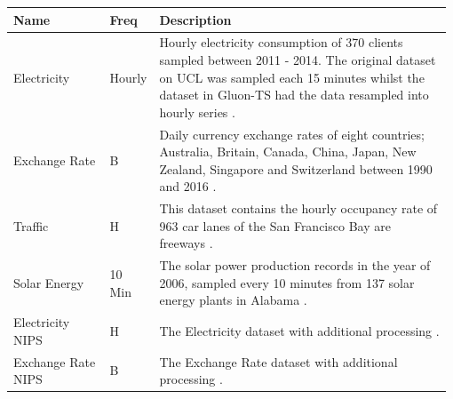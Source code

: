 \begin{table}[h]
  \centering
  \begin{tabular}{p{0.22\linewidth} | p{0.09\linewidth} | p{0.67\linewidth}}
    Name               & Freq   & Description                                                                                                                                                                                                                                                        \\ \hline
    Electricity        & Hourly & Hourly electricity consumption of 370 clients sampled between 2011 - 2014. The original dataset on UCL was sampled each 15 minutes whilst the dataset in Gluon-TS had the data resampled into hourly series \cite{gluonts-website, salinas_high-dimensional_2019}. \\
    \hline
    Exchange Rate      & B      & Daily currency exchange rates of eight countries; Australia, Britain, Canada, China, Japan, New Zealand, Singapore and Switzerland between 1990 and 2016  \cite{lai_modeling_2018}.                                                                                \\
    \hline
    Traffic            & H      & This dataset contains the hourly occupancy rate of 963 car lanes of the San Francisco Bay are freeways \cite{gluonts-github}.                                                                                                                                      \\
    \hline
    Solar Energy       & 10 Min & The solar power production records in the year of 2006, sampled every 10 minutes from 137 solar energy plants in Alabama \cite{lai_modeling_2018}.                                                                                                                 \\
    \hline
    Electricity NIPS   & H      & The Electricity dataset with additional processing \cite{salinas_high-dimensional_2019}.                                                                                                                                                                           \\
    \hline
    Exchange Rate NIPS & B      & The Exchange Rate dataset with additional processing \cite{salinas_high-dimensional_2019}.                                                                                                                                                                         \\

\end{tabular}
\end{table}
